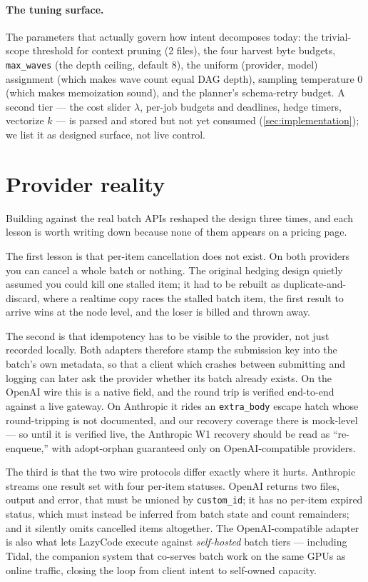 \documentclass[11pt]{article}
\begin{document}
\paragraph{The tuning surface.} The parameters that actually govern how intent decomposes today: the trivial-scope threshold for context pruning (2 files), the four harvest byte budgets, \texttt{max\_waves} (the depth ceiling, default 8), the uniform (provider, model) assignment (which makes wave count equal DAG depth), sampling temperature 0 (which makes memoization sound), and the planner's schema-retry budget. A second tier --- the cost slider $\lambda$, per-job budgets and deadlines, hedge timers, vectorize $k$ --- is parsed and stored but not yet consumed (\cref{sec:implementation}); we list it as designed surface, not live control.

\section{Provider reality}
\label{sec:provider-reality}

Building against the real batch APIs reshaped the design three times, and each lesson is worth writing down because none of them appears on a pricing page.

The first lesson is that per-item cancellation does not exist. On both providers you can cancel a whole batch or nothing. The original hedging design quietly assumed you could kill one stalled item; it had to be rebuilt as duplicate-and-discard, where a realtime copy races the stalled batch item, the first result to arrive wins at the node level, and the loser is billed and thrown away.

The second is that idempotency has to be visible to the provider, not just recorded locally. Both adapters therefore stamp the submission key into the batch's own metadata, so that a client which crashes between submitting and logging can later ask the provider whether its batch already exists. On the OpenAI wire this is a native field, and the round trip is verified end-to-end against a live gateway. On Anthropic it rides an \texttt{extra\_body} escape hatch whose round-tripping is not documented, and our recovery coverage there is mock-level --- so until it is verified live, the Anthropic W1 recovery should be read as ``re-enqueue,'' with adopt-orphan guaranteed only on OpenAI-compatible providers.

The third is that the two wire protocols differ exactly where it hurts. Anthropic streams one result set with four per-item statuses. OpenAI returns two files, output and error, that must be unioned by \texttt{custom\_id}; it has no per-item expired status, which must instead be inferred from batch state and count remainders; and it silently omits cancelled items altogether. The OpenAI-compatible adapter is also what lets LazyCode execute against \emph{self-hosted} batch tiers --- including Tidal, the companion system that co-serves batch work on the same GPUs as online traffic, closing the loop from client intent to self-owned capacity.
\end{document}
